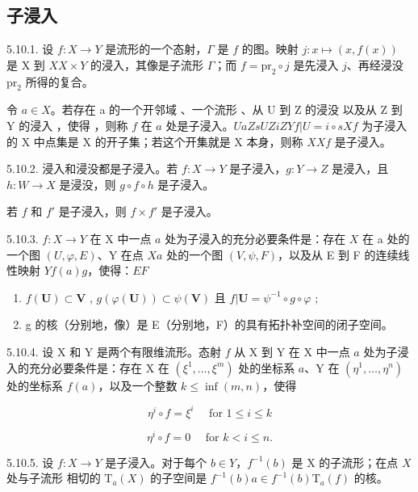\subsection{子浸入}

5.10.1. 设 \(f:X\to Y\) 是流形的一个态射，\(\Gamma\) 是 \(f\) 的图。映射 \(j:x\mapsto(x,f(x))\) 是 X 到 \(X\)\(X\times Y\) 的浸入，其像是子流形 \(\Gamma\)；而 \(f=\mathrm{pr}_{2}\circ j\) 是先浸入 \(j\)、再经浸没 \(\mathrm{pr}_{2}\) 所得的复合。

令 \(a \in X\)。若存在 a 的一个开邻域 、一个流形 、从 U 到 Z 的浸没  以及从 Z 到 Y 的浸入 ，使得 ，则称 \(f\) 在 \(a\) 处是子浸入。\(U\)\(a\)\(Z\)\(s\)\(U\)\(Z\)\(i\)\(Z\)\(Y\)\(f|U = i \circ s\)\(X\)\(f\) 为子浸入的 X 中点集是 X 的开子集；若这个开集就是 X 本身，则称 \(X\)\(X\)\(f\) 是子浸入。

5.10.2. 浸入和浸没都是子浸入。若 \(f: X \to Y\) 是子浸入，\(g: Y \to Z\) 是浸入，且 \(h: W \to X\) 是浸没，则 \(g \circ f \circ h\) 是子浸入。

若 \(f\) 和 \(f'\) 是子浸入，则 \(f \times f'\) 是子浸入。

5.10.3. \(f: X \to Y\) 在 X 中一点 \(a\) 处为子浸入的充分必要条件是：存在 \(X\) 在 a 处的一个图 \((U, \varphi, E)\)、Y 在点 \(X\)\(a\) 处的一个图 \((V, \psi, F)\)，以及从 E 到 F 的连续线性映射 \(Y\)\(f(a)\)\(g\)，使得：\(E\)\(F\)

\begin{enumerate}
\def\labelenumi{(\roman{enumi})}
\item
  \(f(\mathbf{U}) \subset \mathbf{V}\) , \(g(\varphi(\mathbf{U})) \subset \psi(\mathbf{V})\) 且 \(f|\mathbf{U} = \psi^{-1} \circ g \circ \varphi\) ;
\item
  g 的核（分别地，像）是 E（分别地，F）的具有拓扑补空间的闭子空间。
\end{enumerate}

5.10.4. 设 X 和 Y 是两个有限维流形。态射 \(f\) 从 X 到 Y 在 X 中一点 \(a\) 处为子浸入的充分必要条件是：存在 X 在 \((\xi^{1},\ldots,\xi^{m})\) 处的坐标系 \(a\)、Y 在 \((\eta^{1},\ldots,\eta^{n})\) 处的坐标系 \(f(a)\)，以及一个整数 \(k\leqslant\inf(m,n)\)，使得

\[
\eta^ {i} \circ f = \xi^ {i} \quad \text { for } 1 \leqslant i \leqslant k
\]

\[
\eta^ {i} \circ f = 0 \quad \text {   for   } k <   i \leqslant n.
\]

5.10.5. 设 \(f: X \to Y\) 是子浸入。对于每个 \(b \in Y\)，\(f^{-1}(b)\) 是 X 的子流形；在点 \(X\) 处与子流形  相切的 \(\mathrm{T}_{a}(X)\) 的子空间是 \(f^{-1}(b)\)\(a \in f^{-1}(b)\)\(\mathrm{T}_{a}(f)\) 的核。

